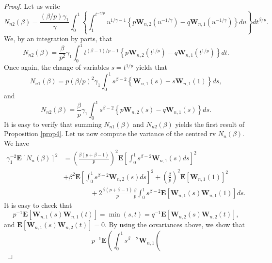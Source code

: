 \documentclass[10pt,a4paper]{amsart}
\begin{document}
\begin{proof}
Let us write
\[
N_{n2}\left(  \beta\right)  =\frac{\left(  \beta/p\right)  \gamma_{1}}{\gamma
}\int_{0}^{1}\left\{
{\displaystyle\int_{1}^{t^{-\gamma/p}}}
u^{1/\gamma-1}\left\{  p\mathbf{W}_{n,2}\left(  u^{-1/\gamma}\right)
-q\mathbf{W}_{n,1}\left(  u^{-1/\gamma}\right)  \right\}  du\right\}
dt^{\beta/p}.
\]
We, by an integration by parts, that%
\[
N_{n2}\left(  \beta\right)  =\frac{\beta}{p^{2}}\gamma_{1}\int_{0}%
^{1}t^{\left(  \beta-1\right)  /p-1}\left\{  p\mathbf{W}_{n,2}\left(
t^{1/p}\right)  -q\mathbf{W}_{n,1}\left(  t^{1/p}\right)  \right\}  dt.
\]
Once again, the change of variables $s=t^{1/p}$ yields that%
\[
N_{n1}\left(  \beta\right)  =p\left(  \beta/p\right)  ^{2}\gamma_{1}\int%
_{0}^{1}s^{\beta-2}\left\{  \mathbf{W}_{n,1}\left(  s\right)  -s\mathbf{W}%
_{n,1}\left(  1\right)  \right\}  ds,
\]
and%
\[
N_{n2}\left(  \beta\right)  =\frac{\beta}{p}\gamma_{1}\int_{0}^{1}s^{\beta
-2}\left\{  p\mathbf{W}_{n,2}\left(  s\right)  -q\mathbf{W}_{n,1}\left(
s\right)  \right\}  ds.
\]
It is easy to verify that summing $N_{n1}\left(  \beta\right)  $ and
$N_{n2}\left(  \beta\right)  $ yields the first result of Proposition
\ref{prop4}. Let us now compute the variance of the centred rv $N_{n}\left(
\beta\right)  .$ We have%
\begin{align*}
\gamma_{1}^{-2}\mathbf{E}\left[  N_{n}\left(  \beta\right)  \right]  ^{2}  &
=\left(  \frac{\beta\left(  p+\beta-1\right)  }{p}\right)  ^{2}\mathbf{E}%
\left[  \int_{0}^{1}s^{\beta-2}\mathbf{W}_{n,1}\left(  s\right)  ds\right]
^{2}\\
&  +\beta^{2}\mathbf{E}\left[  \int_{0}^{1}s^{\beta-2}\mathbf{W}_{n,2}\left(
s\right)  ds\right]  ^{2}+\left(  \frac{\beta}{p}\right)  ^{2}\mathbf{E}%
\left[  \mathbf{W}_{n,1}\left(  1\right)  \right]  ^{2}\\
&  \ \ \ \ \ \ \ \ \ \ \ \ \ \ \ \ \ \ +2\frac{\beta\left(  p+\beta-1\right)
}{p}\frac{\beta}{p}\int_{0}^{1}s^{\beta-2}\mathbf{E}\left[  \mathbf{W}%
_{n,1}\left(  s\right)  \mathbf{W}_{n,1}\left(  1\right)  \right]  ds.
\end{align*}
It is easy to check that%
\[
p^{-1}\mathbf{E}\left[  \mathbf{W}_{n,1}\left(  s\right)  \mathbf{W}%
_{n,1}\left(  t\right)  \right]  =\min\left(  s,t\right)  =q^{-1}%
\mathbf{E}\left[  \mathbf{W}_{n,2}\left(  s\right)  \mathbf{W}_{n,2}\left(
t\right)  \right]  ,
\]
and $\mathbf{E}\left[  \mathbf{W}_{n,1}\left(  s\right)  \mathbf{W}%
_{n,2}\left(  t\right)  \right]  =0.$ By using the covariances above, we show
that%
\[
p^{-1}\mathbf{E}\left(  \int_{0}^{1}s^{\beta-2}\mathbf{W}_{n,1}\left(
\]
\end{proof}
\end{document}
